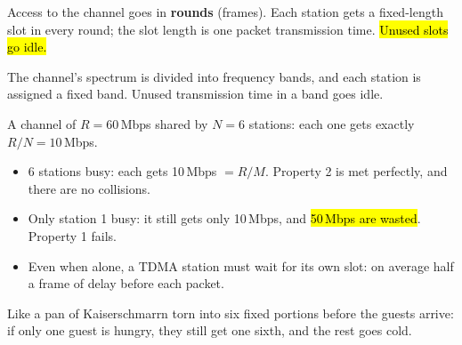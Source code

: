\begin{defn}
Access to the channel goes in \textbf{rounds} (frames). Each station gets a fixed-length slot in every round; the slot length is one packet transmission time.
\hl{Unused slots go idle.}
\end{defn}

\begin{center}
\end{center}

\begin{defn}
The channel's spectrum is divided into frequency bands, and each station is assigned a fixed band. Unused transmission time in a band goes idle.
\end{defn}


\begin{example}
A channel of $R=60$\,Mbps shared by $N=6$ stations: each one gets exactly $R/N=10$\,Mbps.
\begin{itemize}
  \item 6 stations busy: each gets 10\,Mbps $=R/M$. Property 2 is met perfectly, and there are no collisions.
  \item Only station 1 busy: it still gets only 10\,Mbps, and \hl{50\,Mbps are wasted}. Property 1 fails.
  \item Even when alone, a TDMA station must wait for its own slot: on average half a frame of delay before each packet.
\end{itemize}
Like a pan of Kaiserschmarrn torn into six fixed portions before the guests arrive: if only one guest is hungry, they still get one sixth, and the rest goes cold.
\end{example}

